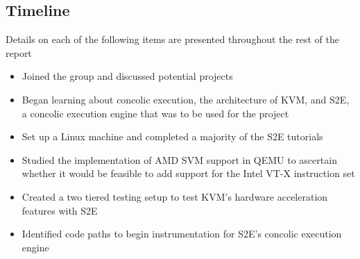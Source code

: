 \documentclass[11pt]{article}
\begin{document}
\subsection{Timeline}
Details on each of the following items are presented throughout the rest of the
report
\begin{itemize}
\item Joined the group and discussed potential projects
\item Began learning about concolic execution, the architecture of KVM, and S2E,
  a concolic execution engine that was to be used for the project
\item Set up a Linux machine and completed a majority of the S2E tutorials
\item Studied the implementation of AMD SVM support in QEMU to ascertain whether
  it would be feasible to add support for the Intel VT-X instruction set
\item Created a two tiered testing setup to test KVM's hardware acceleration
  features with S2E
\item Identified code paths to begin instrumentation for S2E's concolic
  execution engine
\end{itemize}
\end{document}

